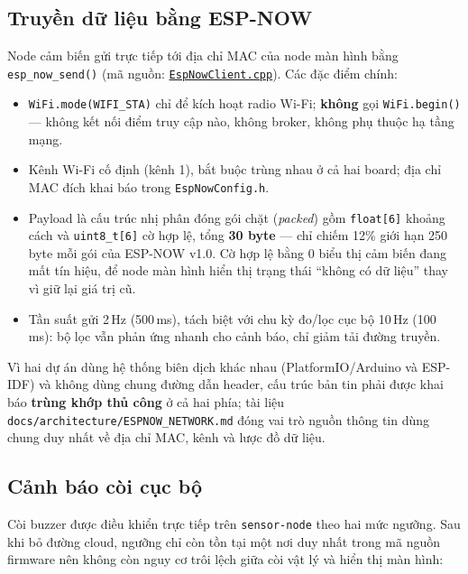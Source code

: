\documentclass[a4paper,12pt]{article}
\newcommand{\code}[1]{\texttt{#1}}
\begin{document}
\subsection{Truyền dữ liệu bằng ESP-NOW}
\label{sec:espnow}

Node cảm biến gửi trực tiếp tới địa chỉ MAC của node màn hình bằng \code{esp\_now\_send()} (mã nguồn: \href{https://github.com/YdtTran/supersonic-warning-system/blob/main/firmware/sensor-node/src/EspNowClient.cpp}{\code{EspNowClient.cpp}}). Các đặc điểm chính:

\begin{itemize}[nosep]
    \item \code{WiFi.mode(WIFI\_STA)} chỉ để kích hoạt radio Wi-Fi; \textbf{không} gọi \code{WiFi.begin()} — không kết nối điểm truy cập nào, không broker, không phụ thuộc hạ tầng mạng.
    \item Kênh Wi-Fi cố định (kênh 1), bắt buộc trùng nhau ở cả hai board; địa chỉ MAC đích khai báo trong \code{EspNowConfig.h}.
    \item Payload là cấu trúc nhị phân đóng gói chặt (\emph{packed}) gồm \code{float[6]} khoảng cách và \code{uint8\_t[6]} cờ hợp lệ, tổng \textbf{30 byte} — chỉ chiếm 12\% giới hạn 250 byte mỗi gói của ESP-NOW v1.0. Cờ hợp lệ bằng 0 biểu thị cảm biến đang mất tín hiệu, để node màn hình hiển thị trạng thái ``không có dữ liệu'' thay vì giữ lại giá trị cũ.
    \item Tần suất gửi 2\,Hz (500\,ms), tách biệt với chu kỳ đo/lọc cục bộ 10\,Hz (100\,ms): bộ lọc vẫn phản ứng nhanh cho cảnh báo, chỉ giảm tải đường truyền.
\end{itemize}

Vì hai dự án dùng hệ thống biên dịch khác nhau (PlatformIO/Arduino và ESP-IDF) và không dùng chung đường dẫn header, cấu trúc bản tin phải được khai báo \textbf{trùng khớp thủ công} ở cả hai phía; tài liệu \code{docs/architecture/ESPNOW\_NETWORK.md} đóng vai trò nguồn thông tin dùng chung duy nhất về địa chỉ MAC, kênh và lược đồ dữ liệu.

\subsection{Cảnh báo còi cục bộ}

Còi buzzer được điều khiển trực tiếp trên \code{sensor-node} theo hai mức ngưỡng. Sau khi bỏ đường cloud, ngưỡng chỉ còn tồn tại một nơi duy nhất trong mã nguồn firmware nên không còn nguy cơ trôi lệch giữa còi vật lý và hiển thị màn hình:
\end{document}
